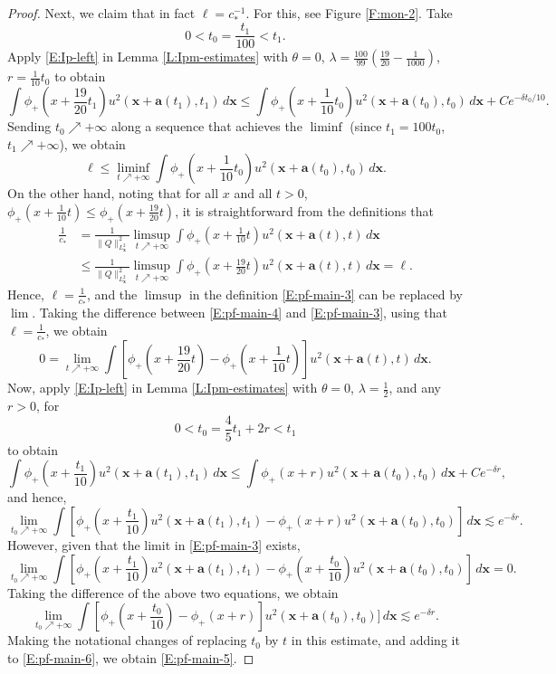 \documentclass[12pt,letterpaper]{amsart}
\theoremstyle{remark}
\numberwithin{equation}{section}
\numberwithin{theorem}{section}
\numberwithin{table}{section}
\begin{document}
\begin{proof}
Next, we claim that in fact $\ell = c_*^{-1}$.  For this, see Figure \ref{F:mon-2}.  Take
$$
0< t_0 = \frac{t_1}{100} < t_1.
$$
Apply  \eqref{E:Ip-left} in Lemma \ref{L:Ipm-estimates} with $\theta=0$, $\lambda = \frac{100}{99}(\frac{19}{20}-\frac{1}{1000})$,  $r=\frac{1}{10}t_0$ to obtain
$$
\int \phi_+( x + \frac{19}{20} t_1) u^2(\mathbf{x}+\mathbf{a}(t_1),t_1) \,d \mathbf{x} \leq
\int \phi_+(x + \frac{1}{10}t_0) u^2(\mathbf{x}+ \mathbf{a}(t_0),t_0) \, d\mathbf{x} + Ce^{-\delta t_0/10}.$$
Sending $t_0\nearrow +\infty$ along a sequence that achieves the $\liminf$ (since $t_1=100t_0$, $t_1\nearrow +\infty$), we obtain
$$
\ell \leq \liminf_{t\nearrow +\infty} \int \phi_+(x + \frac{1}{10}t_0) u^2(\mathbf{x}+ \mathbf{a}(t_0),t_0) \, d\mathbf{x}.
$$ 
On the other hand, noting that for all $x$ and all $t>0$,  $\phi_+(x+\frac{1}{10}t) \leq \phi_+(x+\frac{19}{20}t)$, it is straightforward from the definitions that 
\begin{align*}
\frac{1}{c_*} &= \frac{1}{\|Q\|_{L_{\mathbf{x}}^2}^2} \limsup_{t\nearrow +\infty} \int \phi_+(x  + \frac1{10}t) u^2(\mathbf{x}+ \mathbf{a}(t),t) \, d\mathbf{x} \\
&\leq \frac{1}{\|Q\|_{L_{\mathbf{x}}^2}^2} \limsup_{t\nearrow +\infty} \int \phi_+(x +\frac{19}{20}t) u^2(\mathbf{x}+\mathbf{a}(t),t) \,d \mathbf{x} = \ell.
\end{align*}
Hence, $\ell = \frac{1}{c_*}$, and the $\limsup$ in the definition \eqref{E:pf-main-3} can be replaced by $\lim$.   Taking the difference between \eqref{E:pf-main-4} and \eqref{E:pf-main-3}, using that $\ell=\frac{1}{c_*}$, we obtain
\begin{equation}
\label{E:pf-main-6}
0= \lim_{t\nearrow +\infty} \int [\phi_+(x+\frac{19}{20}t)-\phi_+(x  + \frac1{10}t)] u^2(\mathbf{x}+ \mathbf{a}(t),t) \, d\mathbf{x}.
\end{equation}
Now, apply \eqref{E:Ip-left} in Lemma \ref{L:Ipm-estimates} with $\theta=0$, $\lambda = \frac12$, and any $r>0$, for
$$ 
0<t_0= \frac{4}{5}t_1+2r<t_1
$$
to obtain
$$
\int \phi_+(x+\frac{t_1}{10}) u^2(\mathbf{x}+\mathbf{a}(t_1),t_1) \,d \mathbf{x} \leq \int \phi_+(x+r) u^2(\mathbf{x}+\mathbf{a}(t_0),t_0) \, d\mathbf{x}+Ce^{-\delta r},
$$
and hence,
$$
\lim_{t_0\nearrow +\infty} \int [\phi_+(x+\frac{t_1}{10}) u^2(\mathbf{x}+\mathbf{a}(t_1),t_1)- \phi_+(x+r) u^2(\mathbf{x}+\mathbf{a}(t_0),t_0)] \, d\mathbf{x} \lesssim e^{-\delta r}.
$$
However, given that the limit in \eqref{E:pf-main-3} exists,
$$
\lim_{t_0\nearrow +\infty} \int [\phi_+(x+\frac{t_1}{10}) u^2(\mathbf{x}+\mathbf{a}(t_1),t_1)- \phi_+(x+\frac{t_0}{10}) u^2(\mathbf{x}+\mathbf{a}(t_0),t_0)] \, d\mathbf{x} =0.
$$
Taking the difference of the above two equations, we obtain
$$
\lim_{t_0\nearrow +\infty} \int [\phi_+(x+\frac{t_0}{10}) - \phi_+(x+r)] u^2(\mathbf{x}+\mathbf{a}(t_0),t_0)] \, d\mathbf{x} \lesssim e^{-\delta r}.
$$
Making the notational changes of replacing $t_0$ by $t$ in this estimate, and adding it to \eqref{E:pf-main-6}, we obtain \eqref{E:pf-main-5}.
\end{proof}
\end{document}
